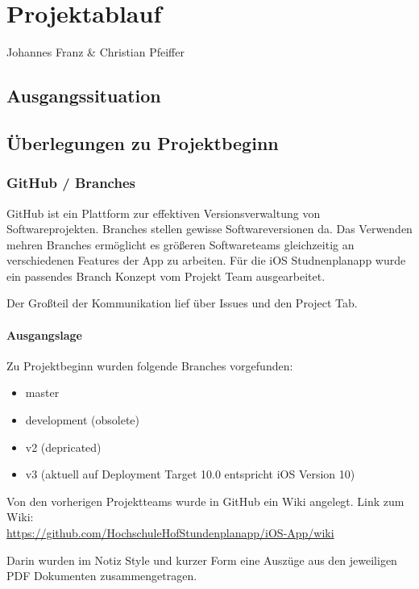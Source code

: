 \chapter{Projektablauf}
Johannes Franz \& Christian Pfeiffer

\section{Ausgangssituation}


\newpage
\section{Überlegungen zu Projektbeginn}

\subsection{GitHub / Branches}
GitHub ist ein Plattform zur effektiven Versionsverwaltung von Softwareprojekten. Branches stellen gewisse Softwareversionen da. Das Verwenden mehren Branches ermöglicht es größeren Softwareteams gleichzeitig an verschiedenen Features der App zu arbeiten.
Für die iOS Studnenplanapp wurde ein passendes Branch Konzept vom Projekt Team ausgearbeitet.

Der Großteil der Kommunikation lief über Issues und den Project Tab.

\subsubsection{Ausgangslage}

Zu Projektbeginn wurden folgende Branches vorgefunden:
\begin{itemize}
\item master
\item development (obsolete)
\item v2 (depricated)
\item v3 (aktuell auf Deployment Target 10.0 entspricht iOS Version 10)
\end{itemize}


Von den vorherigen Projektteams wurde in GitHub ein Wiki angelegt.
Link zum Wiki:\\
\url{https://github.com/HochschuleHofStundenplanapp/iOS-App/wiki}

Darin wurden im Notiz Style und kurzer Form eine Auszüge aus den jeweiligen PDF Dokumenten zusammengetragen.




